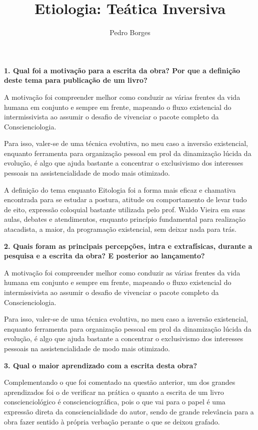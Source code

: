 \documentclass{gescons}
\author{Pedro Borges}
\title{Etiologia: Teática Inversiva}
\begin{document}
    \makeentrevistatitle

    \begin{multicols}{2}

\textbf{1.       Qual foi a motivação para a escrita da obra? Por que a definição deste tema para publicação de um livro?}

A motivação foi compreender melhor como conduzir as várias frentes da vida humana em conjunto e sempre em frente, mapeando o fluxo existencial do intermissivista ao assumir o desafio de vivenciar o pacote completo da Conscienciologia.

Para isso, valer-se de uma técnica evolutiva, no meu caso a inversão existencial, enquanto ferramenta para organização pessoal em prol da dinamização lúcida da evolução, é algo que ajuda bastante a concentrar o exclusivismo dos interesses pessoais na assistencialidade de modo mais otimizado.

A definição do tema enquanto Eitologia foi a forma mais eficaz e chamativa encontrada para se estudar a postura, atitude ou comportamento de levar tudo de eito, expressão coloquial bastante utilizada pelo prof. Waldo Vieira em suas aulas, debates e atendimentos, enquanto princípio fundamental para realização atacadista, a maior, da programação existencial, sem deixar nada para trás.

\textbf{2.       Quais foram as principais percepções, intra e extrafísicas, durante a pesquisa e a escrita da obra? E posterior ao lançamento?}

A motivação foi compreender melhor como conduzir as várias frentes da vida humana em conjunto e sempre em frente, mapeando o fluxo existencial do intermissivista ao assumir o desafio de vivenciar o pacote completo da Conscienciologia.

Para isso, valer-se de uma técnica evolutiva, no meu caso a inversão existencial, enquanto ferramenta para organização pessoal em prol da dinamização lúcida da evolução, é algo que ajuda bastante a concentrar o exclusivismo dos interesses pessoais na assistencialidade de modo mais otimizado.



\textbf{3.       Qual o maior aprendizado com a escrita desta obra?}

Complementando o que foi comentado na questão anterior, um dos grandes aprendizados foi o de verificar na prática o quanto a escrita de um livro conscienciológico é conscienciográfica, pois o que vai para o papel é uma expressão direta da consciencialidade do autor, sendo de grande relevância para a obra fazer sentido à própria verbação perante o que se deixou grafado.



\end{multicols}
\end{document}
